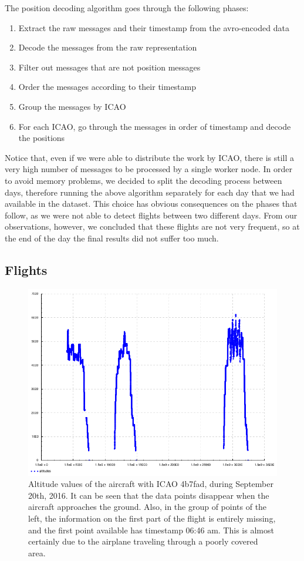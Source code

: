 \documentclass{vldb}
\begin{document}
The position decoding algorithm goes through the following phases:

\begin{enumerate}
  \item Extract the raw messages and their timestamp from the avro-encoded data
  \item Decode the messages from the raw representation
  \item Filter out messages that are not position messages
  \item Order the messages according to their timestamp
  \item Group the messages by ICAO
  \item For each ICAO, go through the messages in order of timestamp and decode
  the positions
\end{enumerate}

Notice that, even if we were able to distribute the work by ICAO, there is still
a very high number of messages to be processed by a single worker node. In order
to avoid memory problems, we decided to split the decoding process between days,
therefore running the above algorithm separately for each day that we had
available in the dataset. This choice has obvious consequences on the phases
that follow, as we were not able to detect flights between two different days.
From our observations, however, we concluded that these flights are not very
frequent, so at the end of the day the final results did not suffer too much.

\subsection{Flights}

\begin{figure}[h]
  \centering
  \includegraphics[scale=0.28]{imgs/4b7fad-altitudes.png}
  \caption{Altitude values of the aircraft with ICAO 4b7fad, during September
    20th, 2016. It can be seen that the data points disappear when the aircraft
    approaches the ground. Also, in the group of points of the left, the
    information on the first part of the flight is entirely missing, and the
    first point available has timestamp 06:46 am. This is almost
    certainly due to the airplane traveling through a poorly covered area.}
  \label{fig:alts}
\end{figure}
\end{document}
